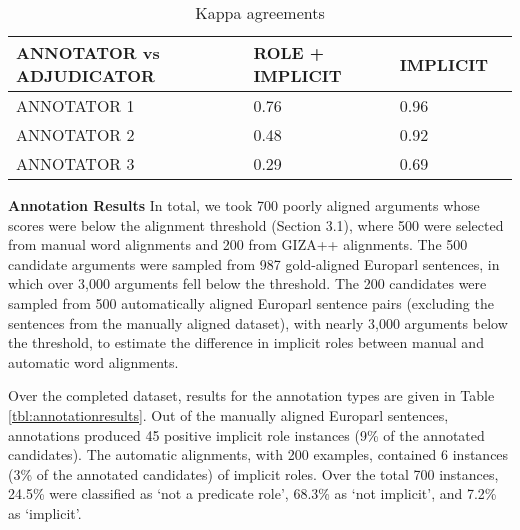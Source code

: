 \documentclass[11pt]{article}
\begin{document}
\begin{table}[h]
\centering
\begin{tabular}{@{}lllr@{}}
\hline
\cline{1-3}
\tiny ANNOTATOR  vs ADJUDICATOR & \tiny ROLE \tiny + \tiny IMPLICIT  &\tiny IMPLICIT\\
\hline
\small \tiny ANNOTATOR 1  & \small 0.76 & \small 0.96     \\
\small \tiny ANNOTATOR 2   & \small 0.48 &\small 0.92     \\
\small \tiny ANNOTATOR 3 & \small 0.29 & \small 0.69      \\
\hline
\end{tabular}
\caption{Kappa agreements}\label{agreement}
\end{table}


{\bf \flushleft Annotation Results }
In total, we took 700 poorly aligned arguments whose scores were below the alignment threshold (Section 3.1), where 500 were selected from manual word alignments and 200 from GIZA++ alignments. The 500 candidate arguments were sampled from 987 gold-aligned Europarl sentences, in which over 3,000
 arguments fell below the threshold. The 200 candidates were sampled from 500
automatically aligned Europarl sentence pairs (excluding the sentences from the manually aligned dataset), with nearly 3,000 arguments below the threshold, to estimate the difference in implicit roles between manual and automatic word alignments.

Over the completed dataset, results for the annotation types are given in Table \ref{tbl:annotationresults}. Out of the manually aligned Europarl sentences, annotations produced 45 positive implicit role instances (9{\%} of the annotated candidates). The automatic alignments, with 200 examples, contained 6 instances (3{\%} of the annotated candidates) of implicit roles. Over the total 700 instances, 24.5{\%} were classified as `not a predicate role', 68.3\% as `not implicit', and 7.2\% as `implicit'.%
\end{document}
